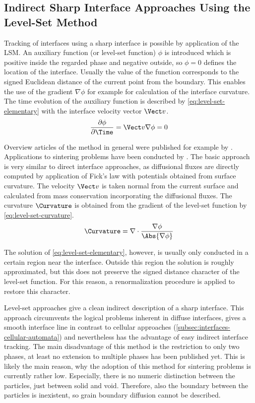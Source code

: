 \subsection{Indirect Sharp Interface Approaches Using the Level-Set Method}\label{subsec:interfaces-level-set}

Tracking of interfaces using a sharp interface is possible by application of the \gls{LSM}.
An auxiliary function (or level-set function) $\phi$ is introduced which is positive inside the regarded phase and negative outside, so $\phi = 0$ defines the location of the interface.
Usually the value of the function corresponds to the signed Euclidean distance of the current point from the boundary.
This enables the use of the gradient $\nabla \phi$ for example for calculation of the interface curvature.
The time evolution of the auxiliary function is described by \cref{eq:level-set-elementary} with the interface velocity vector $\Vect v$.
\begin{equation}
    \frac{\partial\phi}{\partial\Time} = \Vect v \nabla\phi = 0
    \label{eq:level-set-elementary}
\end{equation}

Overview articles of the method in general were published for example by \textcite{Osher2001, Gibou2018, vanDijk2013}.
Applications to sintering problems have been conducted by \textcite{Bruchon2010, Bruchon2012, PinoMunoz2013}.
The basic approach is very similar to direct interface approaches, as diffusional fluxes are directly computed by application of Fick's law with potentials obtained from surface curvature.
The velocity $\Vect v$ is taken normal from the current surface and calculated from mass conservation incorporating the diffusional fluxes.
The curvature $\Curvature$ is obtained from the gradient of the level-set function by \cref{eq:level-set-curvature}.
\begin{equation}
    \Curvature = \nabla \cdot \frac{\nabla\phi}{\Abs{\nabla\phi}}
    \label{eq:level-set-curvature}
\end{equation}

The solution of \cref{eq:level-set-elementary}, however, is usually only conducted in a certain region near the interface.
Outside this region the solution is roughly approximated, but this does not preserve the signed distance character of the level-set function.
For this reason, a renormalization procedure is applied to restore this character.

Level-set approaches give a clean indirect description of a sharp interface.
This approach circumvents the logical problems inherent in diffuse interfaces, gives a smooth interface line in contrast to cellular approaches (\cref{subsec:interfaces-cellular-automata}) and nevertheless has the advantage of easy indirect interface tracking.
The main disadvantage of this method is the restriction to only two phases, at least no extension to multiple phases has been published yet.
This is likely the main reason, why the adoption of this method for sintering problems is currently rather low.
Especially, there is no numeric distinction between the particles, just between solid and void.
Therefore, also the boundary between the particles is inexistent, so grain boundary diffusion cannot be described.

